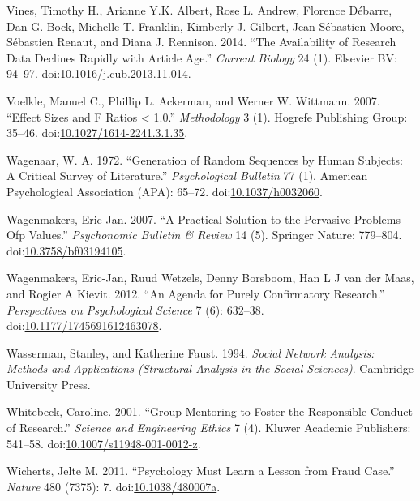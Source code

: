 \documentclass[a5paper]{book}
\begin{document}
\hypertarget{ref-doi:10.1016ux2fj.cub.2013.11.014}{}
Vines, Timothy H., Arianne Y.K. Albert, Rose L. Andrew, Florence
Débarre, Dan G. Bock, Michelle T. Franklin, Kimberly J. Gilbert,
Jean-Sébastien Moore, Sébastien Renaut, and Diana J. Rennison. 2014.
``The Availability of Research Data Declines Rapidly with Article Age.''
\emph{Current Biology} 24 (1). Elsevier BV: 94--97.
doi:\href{https://doi.org/10.1016/j.cub.2013.11.014}{10.1016/j.cub.2013.11.014}.

\hypertarget{ref-doi:10.1027ux2f1614-2241.3.1.35}{}
Voelkle, Manuel C., Phillip L. Ackerman, and Werner W. Wittmann. 2007.
``Effect Sizes and F Ratios \textless{} 1.0.'' \emph{Methodology} 3 (1).
Hogrefe Publishing Group: 35--46.
doi:\href{https://doi.org/10.1027/1614-2241.3.1.35}{10.1027/1614-2241.3.1.35}.

\hypertarget{ref-doi:10.1037ux2fh0032060}{}
Wagenaar, W. A. 1972. ``Generation of Random Sequences by Human
Subjects: A Critical Survey of Literature.'' \emph{Psychological
Bulletin} 77 (1). American Psychological Association (APA): 65--72.
doi:\href{https://doi.org/10.1037/h0032060}{10.1037/h0032060}.

\hypertarget{ref-doi:10.3758ux2fbf03194105}{}
Wagenmakers, Eric-Jan. 2007. ``A Practical Solution to the Pervasive
Problems Ofp Values.'' \emph{Psychonomic Bulletin \& Review} 14 (5).
Springer Nature: 779--804.
doi:\href{https://doi.org/10.3758/bf03194105}{10.3758/bf03194105}.

\hypertarget{ref-doi:10.1177ux2f1745691612463078}{}
Wagenmakers, Eric-Jan, Ruud Wetzels, Denny Borsboom, Han L J van der
Maas, and Rogier A Kievit. 2012. ``An Agenda for Purely Confirmatory
Research.'' \emph{Perspectives on Psychological Science} 7 (6): 632--38.
doi:\href{https://doi.org/10.1177/1745691612463078}{10.1177/1745691612463078}.

\hypertarget{ref-isbn:9780521387071}{}
Wasserman, Stanley, and Katherine Faust. 1994. \emph{Social Network
Analysis: Methods and Applications (Structural Analysis in the Social
Sciences)}. Cambridge University Press.

\hypertarget{ref-doi:10.1007ux2fs11948-001-0012-z}{}
Whitebeck, Caroline. 2001. ``Group Mentoring to Foster the Responsible
Conduct of Research.'' \emph{Science and Engineering Ethics} 7 (4).
Kluwer Academic Publishers: 541--58.
doi:\href{https://doi.org/10.1007/s11948-001-0012-z}{10.1007/s11948-001-0012-z}.

\hypertarget{ref-doi:10.1038ux2f480007a}{}
Wicherts, Jelte M. 2011. ``Psychology Must Learn a Lesson from Fraud
Case.'' \emph{Nature} 480 (7375): 7.
doi:\href{https://doi.org/10.1038/480007a}{10.1038/480007a}.
\end{document}
